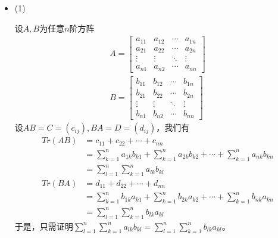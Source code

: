 \documentclass{article}
\begin{document}
\begin{itemize}
  \item (1)

        设$A, B$为任意$n$阶方阵
        \begin{align*}
          A = \begin{bmatrix}
                a_{11} & a_{12} & \cdots & a_{1n} \\
                a_{21} & a_{22} & \cdots & a_{2n} \\
                \vdots & \vdots & \ddots & \vdots \\
                a_{n1} & a_{n2} & \cdots & a_{nn}
              \end{bmatrix} \\
          B = \begin{bmatrix}
                b_{11} & b_{12} & \cdots & b_{1n} \\
                b_{21} & b_{22} & \cdots & b_{2n} \\
                \vdots & \vdots & \ddots & \vdots \\
                b_{n1} & b_{n2} & \cdots & b_{nn}
              \end{bmatrix}
        \end{align*}
        设$AB = C = (c_{ij}), BA = D = (d_{ij})$，我们有
        \begin{align*}
          Tr(AB) & = c_{11} + c_{22} + \cdots + c_{nn}                                       \\
                 & = \sum\limits_{k = 1}^n a_{1k}b_{k1} + \sum\limits_{k = 1}^n a_{2k}b_{k2}
          + \cdots + \sum\limits_{k = 1}^n a_{nk}b_{kn}                                      \\
                 & = \sum \limits_{l = 1}^n \sum\limits_{k = 1}^n a_{lk}b_{kl}
        \end{align*}
        \begin{align*}
          Tr(BA) & = d_{11} + d_{22} + \cdots + d_{nn}                                       \\
                 & = \sum\limits_{k = 1}^n b_{1k}a_{k1} + \sum\limits_{k = 1}^n b_{2k}a_{k2}
          + \cdots + \sum\limits_{k = 1}^n b_{nk}a_{kn}                                      \\
                 & = \sum \limits_{l = 1}^n \sum\limits_{k = 1}^n b_{lk}a_{kl}
        \end{align*}
        于是，只需证明$\sum \limits_{l = 1}^n \sum\limits_{k = 1}^n a_{lk}b_{kl} = \sum \limits_{l = 1}^n \sum\limits_{k = 1}^n b_{lk}a_{kl}$。


\end{itemize}
\end{document}
